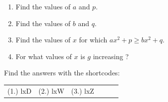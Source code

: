 \begin{enumerate}[noitemsep, label=\textbf{\arabic*}. ]
    \addtocounter{footnote}{-0}
    \label{m39345*id245925}\begin{enumerate}[noitemsep, label=\textbf{\alph*}. ] 
            \label{m39345*uid133}\item Find the values of \begin{math}a\end{math} and \begin{math}p\end{math}.
\label{m39345*uid134}\item Find the values of \begin{math}b\end{math} and \begin{math}q\end{math}.
\label{m39345*uid135}\item Find the values of \begin{math}x\end{math} for which \begin{math}a{x}^{2}+p\ge b{x}^{2}+q\end{math}.
\label{m39345*uid136}\item For what values of \begin{math}x\end{math} is \begin{math}g\end{math} increasing ?
\end{enumerate}
                \end{enumerate}
        
          

        
      

  \label{m39345**end}
          
\par {} Find the answers with the shortcodes:
 \par \begin{tabular}[h]{cccccc}
 (1.) lxD  &  (2.) lxW  &  (3.) lxZ  & \end{tabular}



%     
%     
%     
    
